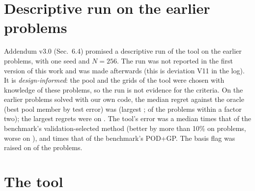 \documentclass[preprint,11pt]{elsarticle}
\begin{document}
\section{Descriptive run on the earlier problems}\label{sec:S-retro}
Addendum v3.0 (Sec.~6.4) promised a descriptive run of the tool on the earlier problems, with one seed and $N=256$. The run was not reported in the first version of this work and was made afterwards (this is deviation V11 in the log). It is \emph{design-informed}: the pool and the grids of the tool were chosen with knowledge of these problems, so the run is not evidence for the criteria. On the \RetroN{} earlier problems solved with our own code, the median regret against the oracle (best pool member by test error) was \RetroMedian{} (largest \RetroMax; \RetroShare{} of the problems within a factor two); the largest regrets were on \RetroWorst. The tool's error was a median \RetroLeg{} times that of the benchmark's validation-selected method (better by more than 10\% on \RetroBetter{} problems, worse on \RetroWorse), and \RetroGp{} times that of the benchmark's POD+GP. The basis flag was raised on \RetroFlagged{} of the problems.

\section{The tool}\label{sec:S-tool}

\end{document}
